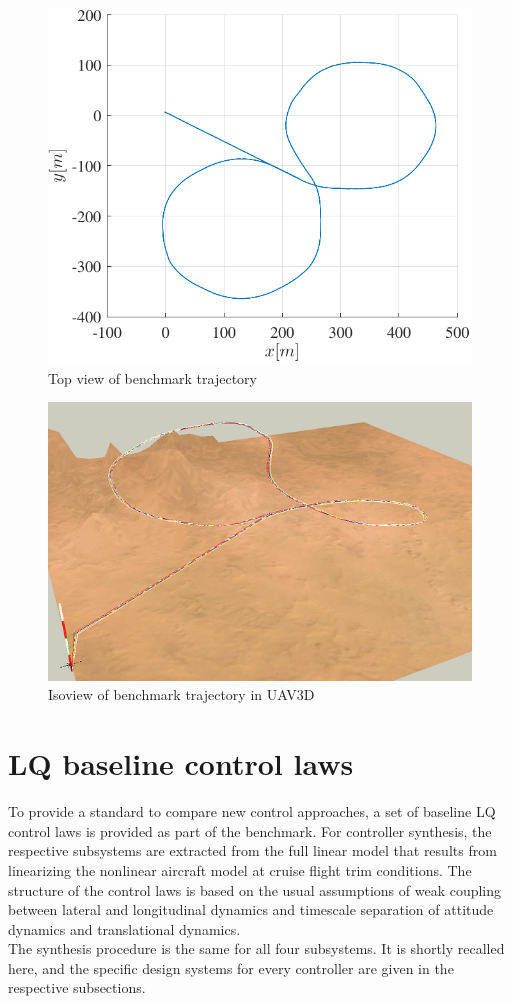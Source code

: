\documentclass{ifacconf}
\begin{document}
\begin{figure}
\centering
\includegraphics[width=\columnwidth]{trajectory.pdf}
\caption{Top view of benchmark trajectory}
\end{figure}

\begin{figure}
\centering
\includegraphics[width=\columnwidth]{UAV3D_helix-lowres}
\caption{Isoview of benchmark trajectory in UAV3D}
\end{figure}


\section{LQ baseline control laws}
\label{sec:lqr}
To provide a standard to compare new control approaches, a set of baseline LQ control laws is provided as part of the benchmark. For controller synthesis, the respective subsystems are extracted from the full linear model that results from linearizing the nonlinear aircraft model at cruise flight trim conditions. The structure of the control laws is based on the usual assumptions of weak coupling between lateral and longitudinal dynamics and timescale separation of attitude dynamics and translational dynamics.\\
The synthesis procedure is the same for all four subsystems. It is shortly recalled here, and the specific design systems for every controller are given in the respective subsections. 
\end{document}
